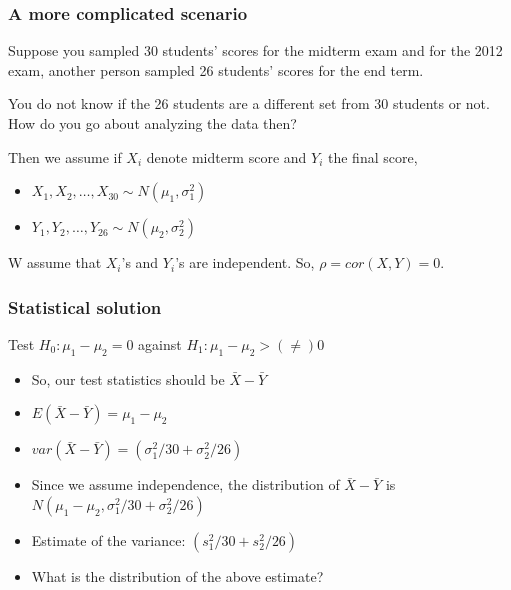 \documentclass{beamer}\usepackage[]{graphicx}\usepackage[]{color}
\begin{document}
\begin{frame}[fragile]

\frametitle{A more complicated scenario}

Suppose you sampled 30 students' scores for the midterm exam and 
for the 2012 exam, another person sampled 26 students' scores for the end term.
\pause \newline

You do not know if the 26 students are a different set from 30 students or not.
How do you go about analyzing the data then? \pause \newline

Then we assume if $X_i$ denote midterm score and $Y_i$ the final score, 

\begin{itemize}
\item $X_1,X_2,\hdots,X_{30} \sim N(\mu_1,\sigma_1^2)$ 
\item $Y_1,Y_2,\hdots,Y_{26} \sim N(\mu_2,\sigma_2^2)$ 
\end{itemize}

W assume that $X_i$'s and $Y_i$'s are independent. So, $\rho=cor(X,Y)=0$.


\end{frame}

\begin{frame}[fragile]

\frametitle{Statistical solution}

Test $H_0:\mu_1-\mu_2=0$ against $H_1:\mu_1-\mu_2 > (\ne) 0$  \pause

\vspace{0.3cm}

\begin{itemize}

\item So, our test statistics should be $\bar X-\bar Y$ \pause

\item $E(\bar X-\bar Y)=\mu_1-\mu_2$  \pause

\item $var(\bar X-\bar Y)=(\sigma_1^2/30+\sigma_2^2/26)$  \pause

\item Since we assume independence, the distribution of $\bar X-\bar Y$ is $N(\mu_1-\mu_2,\sigma_1^2/30+\sigma_2^2/26)$ \pause

\item Estimate of the variance: $(s_1^2/30+s_2^2/26)$ \pause

\item What is the distribution of the above estimate?

\end{itemize}

\end{frame}
\end{document}
